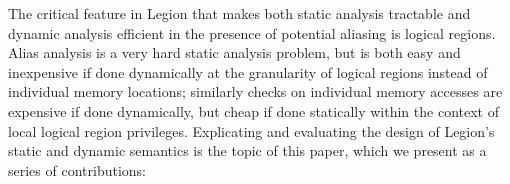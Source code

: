 The critical feature in Legion that makes both static analysis tractable
and dynamic analysis efficient in the presence of potential aliasing is logical regions.
Alias analysis is a very hard static analysis problem, but is both easy and
inexpensive if done dynamically at the granularity of logical regions instead
of individual memory locations; similarly
checks on individual memory accesses are expensive if done dynamically, but
cheap if done statically within the context of local logical region privileges.
Explicating and evaluating the design of Legion's
static and dynamic semantics is the topic of this paper, 
which we present as a series of contributions:
